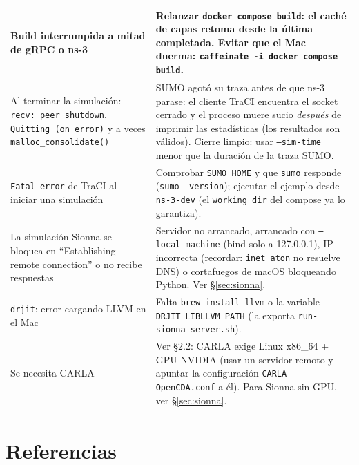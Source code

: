 \documentclass[11pt,a4paper]{article}
\begin{document}
\begin{center}
\begin{tabular}{@{}p{}p{}@{}}
\midrule
Build interrumpida a mitad de gRPC o ns-3 & Relanzar
\texttt{docker compose build}: el cach\'e de capas retoma desde la \'ultima
completada. Evitar que el Mac duerma: \texttt{caffeinate -i docker compose
build}. \\
\midrule
Al terminar la simulaci\'on: \texttt{recv: peer shutdown}, \texttt{Quitting
(on error)} y a veces \texttt{malloc\_consolidate()} & SUMO agot\'o su traza
antes de que ns-3 parase: el cliente TraCI encuentra el socket cerrado y el
proceso muere sucio \emph{despu\'es} de imprimir las estad\'isticas (los
resultados son v\'alidos). Cierre limpio: usar \texttt{--sim-time} menor que
la duraci\'on de la traza SUMO. \\
\midrule
\texttt{Fatal error} de TraCI al iniciar una simulaci\'on & Comprobar
\texttt{SUMO\_HOME} y que \texttt{sumo} responde
(\texttt{sumo --version}); ejecutar el ejemplo desde \texttt{ns-3-dev}
(el \texttt{working\_dir} del compose ya lo garantiza). \\
\midrule
La simulaci\'on Sionna se bloquea en ``Establishing remote connection'' o no
recibe respuestas & Servidor no arrancado, arrancado con
\texttt{--local-machine} (bind solo a 127.0.0.1), IP incorrecta (recordar:
\texttt{inet\_aton} no resuelve DNS) o cortafuegos de macOS bloqueando
Python. Ver \S\ref{sec:sionna}. \\
\midrule
\texttt{drjit}: error cargando LLVM en el Mac & Falta
\texttt{brew install llvm} o la variable \texttt{DRJIT\_LIBLLVM\_PATH}
(la exporta \texttt{run-sionna-server.sh}). \\
\midrule
Se necesita CARLA & Ver \S2.2: CARLA exige Linux x86\_64 + GPU
NVIDIA (usar un servidor remoto y apuntar la configuraci\'on
\texttt{CARLA-OpenCDA.conf} a \'el). Para Sionna sin GPU, ver
\S\ref{sec:sionna}. \\
\bottomrule
\end{tabular}
\end{center}

\section{Referencias}
\end{document}
